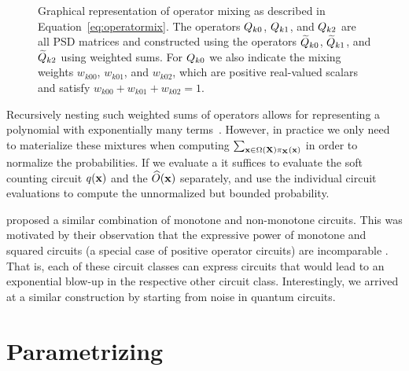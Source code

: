 \begin{figure}[t]
	\centering
	
	\caption{
	Graphical representation of operator mixing as described in Equation~\ref{eq:operatormix}. The operators $Q_{k0}$, $Q_{k1}$, and $Q_{k2}$ are all PSD matrices and constructed using the operators  $\widetilde{Q}_{k0}$, $\widetilde{Q}_{k1}$, and $\widetilde{Q}_{k2}$ using weighted sums. For $Q_{k0}$ we also indicate the mixing weights $w_{k00}$, $w_{k01}$, and $w_{k02}$, which are positive real-valued scalars and satisfy $w_{k00}+ w_{k01}+w_{k02}=1$.
	}
	\label{fig:operatormixture}
\end{figure}






Recursively nesting such weighted sums of operators allows for representing a polynomial with exponentially many terms~\citep{martens2014expressive}.
However, in practice we only need to materialize these mixtures when computing $\sum_{\mathbf{x} \in \Omega(\mathbf{X}) \pi_{\mathbf{X}}(\mathbf{x})}$ in order to normalize the probabilities.
If we evaluate a \noisepunc it suffices to evaluate the soft counting circuit $q(\mathbf{x})$ and the \punc $\widehat{O}(\mathbf{x})$ separately, and use the individual circuit evaluations to compute the unnormalized but bounded probability.

\citet{loconte2024relationship} proposed a similar combination of monotone and non-monotone circuits. This was motivated by their observation that the expressive power of monotone and squared circuits (a special case of positive operator circuits) are incomparable \citep{decolnet2021compilation}. That is, each of these circuit classes can express circuits that would lead to an exponential blow-up in the respective other circuit class.
Interestingly, we arrived at a similar construction by starting from noise in quantum circuits.























\section{Parametrizing \puncs}

